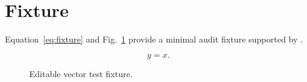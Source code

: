 \documentclass{article}
\begin{document}
\section{Fixture}

Equation~\eqref{eq:fixture} and Fig.~\ref{fig:fixture} provide a minimal audit fixture supported by \cite{fixture2026}.

\begin{equation}
  y=x.
  \label{eq:fixture}
\end{equation}

\begin{figure}
  \centering
  \fbox{\rule{0pt}{25mm}\rule{45mm}{0pt}}
  \caption{Editable vector test fixture.}
  \label{fig:fixture}
\end{figure}



\end{document}
